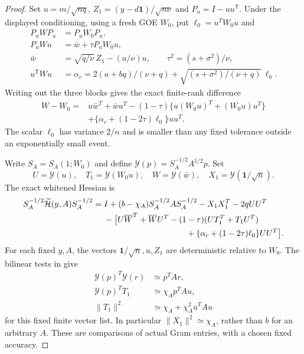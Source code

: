 \begin{proof}
Set $u=m/\sqrt{nq}$, $Z_1=(y-d\mathbf1)/\sqrt{n\nu}$ and
$P_u=I-uu^{\mathsf T}$.  Under the displayed conditioning, using a
fresh GOE $W_0$, put \(\ell_0=u^TW_0u\) and
\[
 \begin{split}
 P_uWP_u&=P_uW_0P_u,\\
 P_uWu&=\bar w+\tau P_uW_0u,\\
 \bar w&=\sqrt{q/\nu}\,Z_1-(a/\nu)u,
 \qquad \tau^2=(s+\sigma^2)/\nu,\\
 u^{\mathsf T}Wu&=\alpha_c
 =2(a+bq)/(\nu+q)
       +\sqrt{(s+\sigma^2)/(\nu+q)}\,\ell_0.
 \end{split}
\]
Writing out the three blocks gives the exact finite-rank difference
\[
\begin{split}
 W-W_0={}&u\bar w^T+\bar w u^T
 -(1-\tau)\{u(W_0u)^T+(W_0u)u^T\}\\
 &+\{\alpha_c+(1-2\tau)\ell_0\}uu^T.
\end{split}
\]
The scalar \(\ell_0\) has variance \(2/n\) and is smaller than
any fixed tolerance outside an exponentially small event.

Write \(S_A=S_A(1;W_0)\) and define
\(\mathcal Y(p)=S_A^{-1/2}A^{1/2}p\). Set
\[
 U=\mathcal Y(u),\quad T_1=\mathcal Y(W_0u),\quad
 \overline W=\mathcal Y(\bar w),\quad
 X_1=\mathcal Y(\mathbf1/\sqrt n).
\]
The exact whitened Hessian is
\[
\begin{split}
 S_A^{-1/2}\widetilde{\mathcal H}(y,A)S_A^{-1/2}
 ={}&I+(b-\chi_A)S_A^{-1/2}AS_A^{-1/2}
       -X_1X_1^T-2qUU^T\\
 &-\bigl[U\overline W^T+\overline WU^T
 -(1-\tau)(UT_1^T+T_1U^T)\\
 &\hspace{35mm}
       +\{\alpha_c+(1-2\tau)\ell_0\}UU^T\bigr].
\end{split}
\]
For each fixed \(y,A\), the vectors
\(\mathbf1/\sqrt n,u,Z_1\) are deterministic relative to \(W_0\).
The bilinear tests in  give
\[
\begin{split}
 \mathcal Y(p)^T\mathcal Y(r)&\simeq p^TAr,\\
 \mathcal Y(p)^TT_1&\simeq\chi_Ap^TAu,\\
 \|T_1\|^2&\simeq\chi_A+\chi_A^2u^TAu
\end{split}
\]
for this fixed finite vector list. In particular
\(\|X_1\|^2\simeq\chi_A\), rather than \(b\) for an arbitrary
\(A\). These are comparisons of actual Gram entries, with a
chosen fixed accuracy.


\end{proof}
